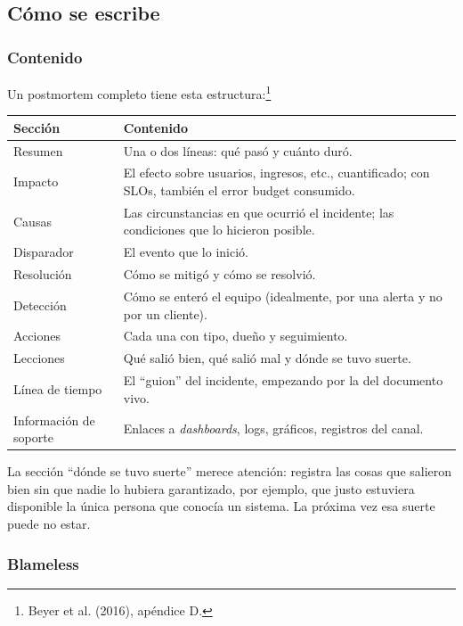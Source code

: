 \documentclass[variant=apuntes,cover=institutional,mode=screen]{ua-engineering-v6-article}
\begin{document}
\subsection{Cómo se escribe}

\subsubsection{Contenido}

Un postmortem completo tiene esta estructura:\footnote{Beyer et al. (2016), apéndice D.}

\begin{center}
\begin{tabular}{p{}p{}}
\toprule
\textbf{Sección} & \textbf{Contenido} \\
\midrule
Resumen & Una o dos líneas: qué pasó y cuánto duró. \\
Impacto & El efecto sobre usuarios, ingresos, etc., cuantificado; con SLOs, también el error budget consumido. \\
Causas & Las circunstancias en que ocurrió el incidente; las condiciones que lo hicieron posible. \\
Disparador & El evento que lo inició. \\
Resolución & Cómo se mitigó y cómo se resolvió. \\
Detección & Cómo se enteró el equipo (idealmente, por una alerta y no por un cliente). \\
Acciones & Cada una con tipo, dueño y seguimiento. \\
Lecciones & Qué salió bien, qué salió mal y dónde se tuvo suerte. \\
Línea de tiempo & El ``guion'' del incidente, empezando por la del documento vivo. \\
Información de soporte & Enlaces a \emph{dashboards}, logs, gráficos, registros del canal. \\
\bottomrule
\end{tabular}
\end{center}

La sección ``dónde se tuvo suerte'' merece atención: registra las cosas que salieron bien sin que nadie lo hubiera garantizado, por ejemplo, que justo estuviera disponible la única persona que conocía un sistema. La próxima vez esa suerte puede no estar.

\subsubsection{Blameless}
\end{document}

